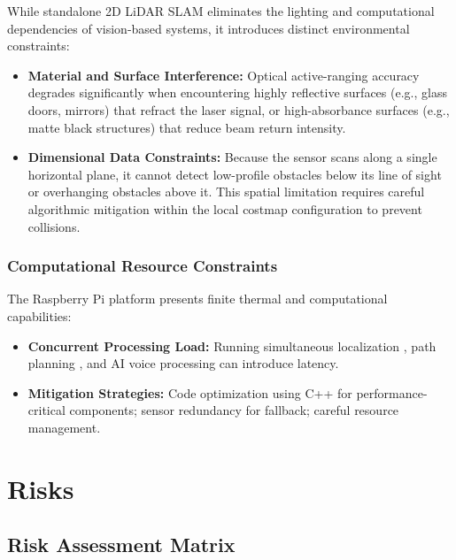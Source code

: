 \documentclass[12pt,a4paper]{report}
\begin{document}
While standalone 2D LiDAR SLAM eliminates the lighting and computational dependencies of vision-based systems, it introduces distinct environmental constraints:
\begin{itemize}
    \item \textbf{Material and Surface Interference:} Optical active-ranging accuracy degrades significantly when encountering highly reflective surfaces (e.g., glass doors, mirrors) that refract the laser signal, or high-absorbance surfaces (e.g., matte black structures) that reduce beam return intensity.
    \item \textbf{Dimensional Data Constraints:} Because the sensor scans along a single horizontal plane, it cannot detect low-profile obstacles below its line of sight or overhanging obstacles above it. This spatial limitation requires careful algorithmic mitigation within the local costmap configuration to prevent collisions.
\end{itemize}

\subsubsection{Computational Resource Constraints}

The Raspberry Pi platform presents finite thermal and computational capabilities:
\begin{itemize}
    \item \textbf{Concurrent Processing Load:} Running simultaneous localization \cite{orbslam3}, path planning \cite{nav2}, and AI voice processing  can introduce latency.
    \item \textbf{Mitigation Strategies:} Code optimization using C++ for performance-critical components; sensor redundancy for fallback; careful resource management.
\end{itemize}

\section{Risks}


\subsection{Risk Assessment Matrix}
\end{document}
